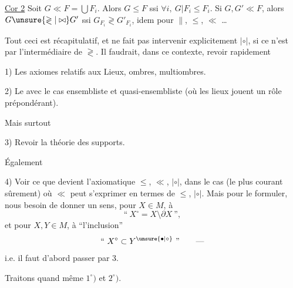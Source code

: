 


\uline{Cor 2} Soit $G\ll F=\bigcup F_i$. Alors $G\leq F$ ssi $\forall i,\ G|F_i\leq F_i$.  Si $G,G'\ll F$, alors $G\unsure{\gtrless|\bowtie}G'$ ssi  $G_{F_i}\gtrless G'_{F_i}$, idem pour $\parallel$, $\leq$, $\ll$ \ldots

Tout ceci est récapitulatif, et ne fait pas intervenir explicitement $\mathrel{|\circ|}$, si ce n'est par l'intermédiaire de $\gtrless$. Il faudrait, dans ce contexte, revoir  rapidement

1) Les axiomes relatifs aux Lieux, ombres, multiombres.

2) Le  avec le cas ensembliste et quasi-ensembliste (où les lieux jouent  un rôle prépondérant).

Mais surtout

3) Revoir la théorie des supports.

 Également

4) Voir ce que devient l'axiomatique $\leq$, $\ll$, $\mathrel{|\circ|}$, dans le cas (le plus courant sûrement) où $\ll$ peut s'exprimer en termes de $\leq$, $\mathrel{|\circ|}$. Mais pour le formuler, nous  besoin de donner un sens, pour $X\in M$, à
\[
\text{``}\ X^\circ=X\setminus\partial X\ \text{''},
\]
et pour $X,Y\in M$, à ``l'inclusion''
\[
\text{``}\ X^\circ\subset Y^{\unsure{\bullet|\circ}}\ \text{''}\qquad\text{---}
\]
i.e. il faut d'abord passer par 3.

Traitons quand même $1^\circ)$ et $2^\circ)$.

